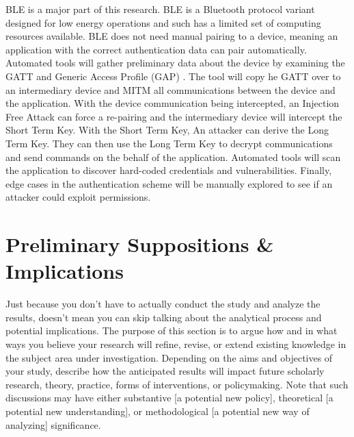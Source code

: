 \documentclass[10pt,twocolumn,letterpaper]{article}
\begin{document}
BLE is a major part of this research. BLE is a Bluetooth protocol variant designed for low energy operations and such has a limited set of computing resources available. BLE does not need manual pairing to a device, meaning an application with the correct authentication data can pair automatically. Automated tools will gather preliminary data about the device by examining the GATT and Generic Access Profile (GAP) . The tool will copy he GATT over to an intermediary device and MITM all communications between the device and the application. With the device communication being intercepted, an Injection Free Attack can force a re-pairing and the intermediary device will intercept the Short Term Key. With the Short Term Key,  An attacker can derive the Long Term Key. They can then use the Long Term Key to decrypt communications and send commands on the behalf of the application. Automated tools will scan the application to discover hard-coded credentials and vulnerabilities. Finally, edge cases in the authentication scheme will be manually explored to see if an attacker could exploit permissions.


\section{Preliminary Suppositions \& Implications}
Just because you don't have to actually conduct the study and analyze the results, doesn't mean you can skip talking about the analytical process and potential implications. The purpose of this section is to argue how and in what ways you believe your research will refine, revise, or extend existing knowledge in the subject area under investigation. Depending on the aims and objectives of your study, describe how the anticipated results will impact future scholarly research, theory, practice, forms of interventions, or policymaking. Note that such discussions may have either substantive [a potential new policy], theoretical [a potential new understanding], or methodological [a potential new way of analyzing] significance.
 
\end{document}
